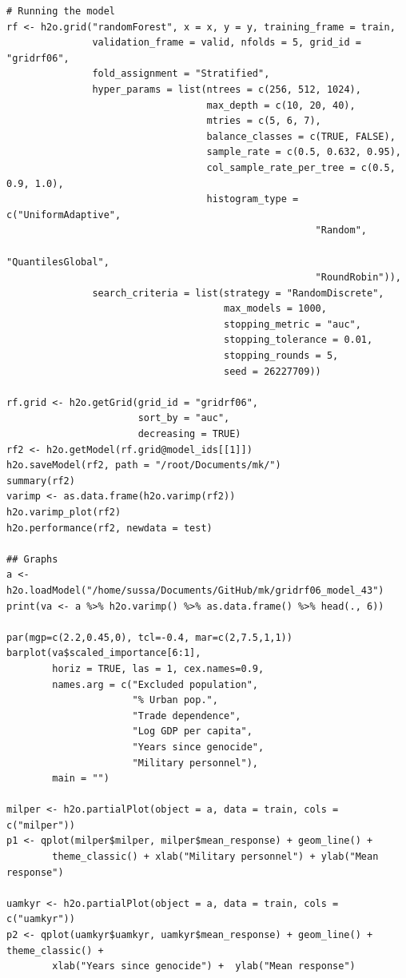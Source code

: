 \begin{verbatim}
# Running the model
rf <- h2o.grid("randomForest", x = x, y = y, training_frame = train, 
               validation_frame = valid, nfolds = 5, grid_id = "gridrf06",
               fold_assignment = "Stratified",
               hyper_params = list(ntrees = c(256, 512, 1024),
                                   max_depth = c(10, 20, 40),
                                   mtries = c(5, 6, 7),
                                   balance_classes = c(TRUE, FALSE),
                                   sample_rate = c(0.5, 0.632, 0.95),
                                   col_sample_rate_per_tree = c(0.5, 0.9, 1.0),
                                   histogram_type = c("UniformAdaptive",
                                                      "Random",
                                                      "QuantilesGlobal",
                                                      "RoundRobin")),
               search_criteria = list(strategy = "RandomDiscrete", 
                                      max_models = 1000, 
                                      stopping_metric = "auc", 
                                      stopping_tolerance = 0.01, 
                                      stopping_rounds = 5, 
                                      seed = 26227709)) 

rf.grid <- h2o.getGrid(grid_id = "gridrf06",
                       sort_by = "auc",
                       decreasing = TRUE)
rf2 <- h2o.getModel(rf.grid@model_ids[[1]])
h2o.saveModel(rf2, path = "/root/Documents/mk/")
summary(rf2)
varimp <- as.data.frame(h2o.varimp(rf2))
h2o.varimp_plot(rf2)
h2o.performance(rf2, newdata = test)

## Graphs
a <- h2o.loadModel("/home/sussa/Documents/GitHub/mk/gridrf06_model_43")
print(va <- a %>% h2o.varimp() %>% as.data.frame() %>% head(., 6)) 

par(mgp=c(2.2,0.45,0), tcl=-0.4, mar=c(2,7.5,1,1))
barplot(va$scaled_importance[6:1],
        horiz = TRUE, las = 1, cex.names=0.9,
        names.arg = c("Excluded population",
                      "% Urban pop.", 
                      "Trade dependence",
                      "Log GDP per capita",
                      "Years since genocide", 
                      "Military personnel"),
        main = "")
        
milper <- h2o.partialPlot(object = a, data = train, cols = c("milper"))
p1 <- qplot(milper$milper, milper$mean_response) + geom_line() +
        theme_classic() + xlab("Military personnel") + ylab("Mean response")

uamkyr <- h2o.partialPlot(object = a, data = train, cols = c("uamkyr"))
p2 <- qplot(uamkyr$uamkyr, uamkyr$mean_response) + geom_line() + theme_classic() + 
        xlab("Years since genocide") +  ylab("Mean response")
        

\end{verbatim}
